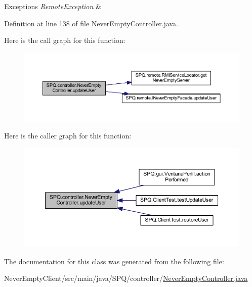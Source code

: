 \begin{DoxyExceptions}{Exceptions}
{\em Remote\+Exception} & \\
\hline
\end{DoxyExceptions}


Definition at line 138 of file Never\+Empty\+Controller.\+java.

Here is the call graph for this function\+:\nopagebreak
\begin{figure}[H]
\begin{center}
\leavevmode
\includegraphics[width=350pt]{class_s_p_q_1_1controller_1_1_never_empty_controller_abac74fe36817d476abdd20d19df2092b_cgraph}
\end{center}
\end{figure}
Here is the caller graph for this function\+:\nopagebreak
\begin{figure}[H]
\begin{center}
\leavevmode
\includegraphics[width=350pt]{class_s_p_q_1_1controller_1_1_never_empty_controller_abac74fe36817d476abdd20d19df2092b_icgraph}
\end{center}
\end{figure}


The documentation for this class was generated from the following file\+:\begin{DoxyCompactItemize}
\item 
Never\+Empty\+Client/src/main/java/\+S\+P\+Q/controller/\mbox{\hyperlink{_never_empty_controller_8java}{Never\+Empty\+Controller.\+java}}\end{DoxyCompactItemize}

